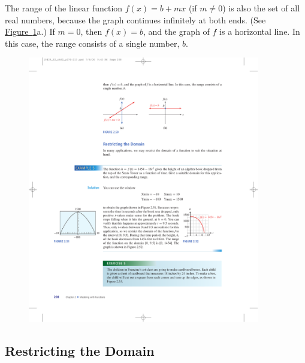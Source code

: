 \documentclass[10pt,]{book}
\theoremstyle{plain}
\theoremstyle{definition}
\theoremstyle{definition}
\theoremstyle{definition}
\theoremstyle{definition}
\theoremstyle{definition}
\numberwithin{equation}{section}
\begin{document}
    The range of the linear function \(f (x) = b + mx\) (if \(m \ne 0\)) is also the set of all real numbers, because the graph continues infinitely at both ends. (See \hyperref[fig-two-graphs-of-lines]{Figure~\ref{fig-two-graphs-of-lines}}a.) If \(m = 0\), then \(f (x) = b\), and the graph of \(f\) is a horizontal line. In this case, the range consists of a single number, \(b\).
%
\leavevmode%
\begin{figure}
\centering
\includegraphics[width=0.90\textwidth,]{images/fig-two-graphs-of-lines.pdf}\caption{\label{fig-two-graphs-of-lines}}
\end{figure}
\typeout{************************************************}
\typeout{************************************************}
\subsection[Restricting the Domain]{Restricting the Domain}\label{subsection-55}
\end{document}

